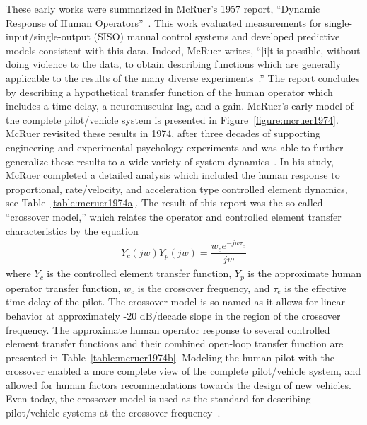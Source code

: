 \documentclass[float=false, crop=false]{standalone}
\begin{document}
These early works were summarized in McRuer's 1957 report, ``Dynamic Response of Human Operators''~\cite{McRuer1957}.
This work evaluated measurements for single-input/single-output (SISO) manual control systems and developed predictive models consistent with this data.
Indeed, McRuer writes, ``[i]t is possible, without doing violence to the data, to obtain describing functions which are generally applicable to the results of the many diverse experiments~\cite{McRuer1957}.''
The report concludes by describing a hypothetical transfer function of the human operator which includes a time delay, a neuromuscular lag, and a gain.
McRuer's early model of the complete pilot/vehicle system is presented in Figure~\ref{figure:mcruer1974}.
McRuer revisited these results in 1974, after three decades of supporting engineering and experimental psychology experiments and was able to further generalize these results to a wide variety of system dynamics~\cite{McRuer1974}.
In his study, McRuer completed a detailed analysis which included the human response to proportional, rate/velocity, and acceleration type controlled element dynamics, see Table~\ref{table:mcruer1974a}.
The result of this report was the so called ``crossover model,'' which relates the operator and controlled element transfer characteristics by the equation
\begin{align}
Y_c(jw) Y_p(jw) = \dfrac{w_c e^{-jw \tau_e}}{jw}
\end{align}
where $Y_c$ is the controlled element transfer function, $Y_p$ is the approximate human operator transfer function, $w_c$ is the crossover frequency, and $\tau_e$ is the effective time delay of the pilot.
The crossover model is so named as it allows for linear behavior at approximately -20 dB/decade slope in the region of the crossover frequency.
The approximate human operator response to several controlled element transfer functions and their combined open-loop transfer function are presented in Table~\ref{table:mcruer1974b}.
Modeling the human pilot with the crossover enabled a more complete view of the complete pilot/vehicle system, and allowed for human factors recommendations towards the design of new vehicles.
Even today, the crossover model is used as the standard for describing pilot/vehicle systems at the crossover frequency~\cite{McRuer1965, McRuer1974, Xu2017}.
\end{document}
